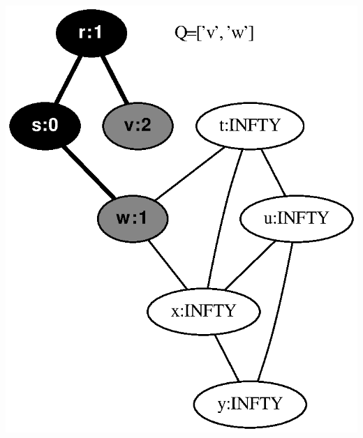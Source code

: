 \documentclass{article}
\begin{document}
\vspace{1em}
\includegraphics[height=.3\textheight]{clrs_example_bfs_02.eps}
\vspace{1em}
\end{document}
